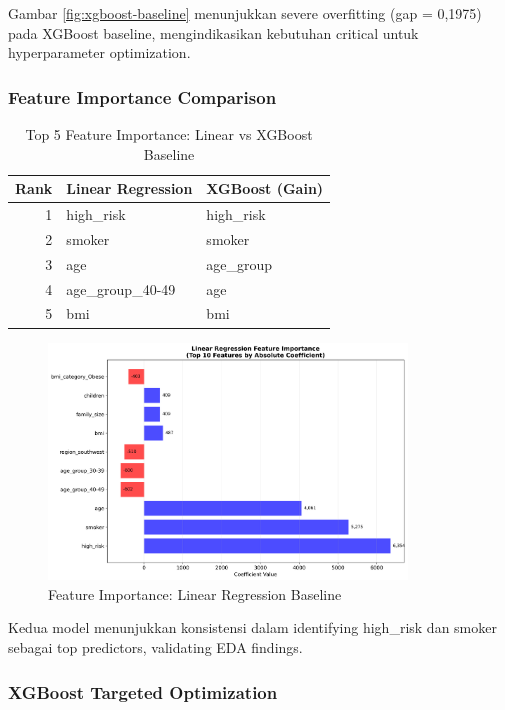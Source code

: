 Gambar \ref{fig:xgboost-baseline} menunjukkan severe overfitting (gap = 0,1975) pada XGBoost baseline, mengindikasikan kebutuhan critical untuk hyperparameter optimization.

\subsubsection{Feature Importance Comparison}

\begin{table}[H]
\centering
\caption{Top 5 Feature Importance: Linear vs XGBoost Baseline}
\label{tab:feature-importance-comp}
\begin{tabular}{|r|l|l|}
\hline
\textbf{Rank} & \textbf{Linear Regression} & \textbf{XGBoost (Gain)} \\
\hline
1 & high\_risk & high\_risk \\
2 & smoker & smoker \\
3 & age & age\_group \\
4 & age\_group\_40-49 & age \\
5 & bmi & bmi \\
\hline
\end{tabular}
\end{table}

\begin{figure}[H]
\centering
\includegraphics[width=0.85\textwidth]{../results/plots/08_baseline_feature_importance.png}
\caption{Feature Importance: Linear Regression Baseline}
\label{fig:baseline-feature-importance}
\end{figure}

Kedua model menunjukkan konsistensi dalam identifying high\_risk dan smoker sebagai top predictors, validating EDA findings.

\subsubsection{XGBoost Targeted Optimization}

